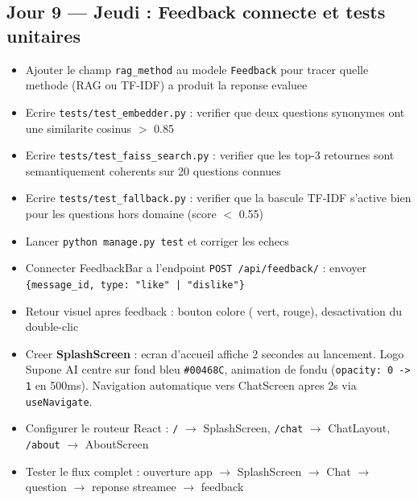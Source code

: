 \documentclass[11pt,a4paper]{article}
\begin{document}
\subsection{Jour 9 --- Jeudi : Feedback connecte et tests unitaires}

\begin{ragbox}[Backend --- J9]
\begin{itemize}
    \item[$\square$] Ajouter le champ \texttt{rag\_method} au modele \texttt{Feedback} pour tracer quelle methode (RAG ou TF-IDF) a produit la reponse evaluee
    \item[$\square$] Ecrire \texttt{tests/test\_embedder.py} : verifier que deux questions synonymes ont une similarite cosinus $>$ 0.85
    \item[$\square$] Ecrire \texttt{tests/test\_faiss\_search.py} : verifier que les top-3 retournes sont semantiquement coherents sur 20 questions connues
    \item[$\square$] Ecrire \texttt{tests/test\_fallback.py} : verifier que la bascule TF-IDF s'active bien pour les questions hors domaine (score $<$ 0.55)
    \item[$\square$] Lancer \texttt{python manage.py test} et corriger les echecs
\end{itemize}
\end{ragbox}

\begin{reactbox}[Frontend --- J9]
\begin{itemize}
    \item[$\square$] Connecter FeedbackBar a l'endpoint \texttt{POST /api/feedback/} : envoyer \texttt{\{message\_id, type: "like" | "dislike"\}}
    \item[$\square$] Retour visuel apres feedback : bouton colore ( vert,  rouge), desactivation du double-clic
    \item[$\square$] Creer \textbf{SplashScreen} : ecran d'accueil affiche 2 secondes au lancement. Logo Supone AI centre sur fond bleu \texttt{\#00468C}, animation de fondu (\texttt{opacity: 0 -> 1} en 500ms). Navigation automatique vers ChatScreen apres 2s via \texttt{useNavigate}.
    \item[$\square$] Configurer le routeur React : \texttt{/} $\rightarrow$ SplashScreen, \texttt{/chat} $\rightarrow$ ChatLayout, \texttt{/about} $\rightarrow$ AboutScreen
    \item[$\square$] Tester le flux complet : ouverture app $\rightarrow$ SplashScreen $\rightarrow$ Chat $\rightarrow$ question $\rightarrow$ reponse streamee $\rightarrow$ feedback
\end{itemize}
\end{reactbox}
\end{document}
